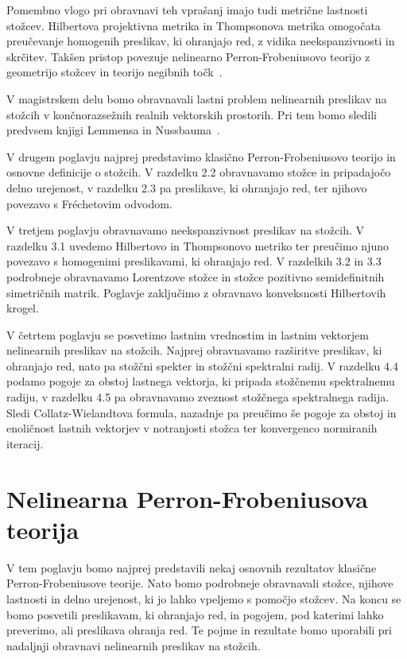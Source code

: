 \documentclass[mat2, tisk]{fmfdelo}
\begin{document}
Pomembno vlogo pri obravnavi teh vprašanj imajo tudi metrične lastnosti
stožcev. Hilbertova projektivna metrika in Thompsonova metrika omogočata
preučevanje homogenih preslikav, ki ohranjajo red, z vidika
neekspanzivnosti in skrčitev. Takšen pristop povezuje nelinearno
Perron-Frobeniusovo teorijo z geometrijo stožcev in teorijo negibnih
točk~\cite{LemNuss}.

V magistrskem delu bomo obravnavali lastni problem nelinearnih
preslikav na stožcih v končnorazsežnih realnih vektorskih prostorih.
Pri tem bomo sledili predvsem knjigi Lemmensa in Nussbauma~\cite{LemNuss}.

V drugem poglavju najprej
predstavimo klasično Perron-Frobeniusovo teorijo in osnovne definicije
o stožcih. V razdelku 2.2 obravnavamo stožce in pripadajočo delno
urejenost, v razdelku 2.3 pa preslikave, ki ohranjajo red, ter njihovo
povezavo s Fréchetovim odvodom.

V tretjem poglavju obravnavamo neekspanzivnost preslikav na stožcih.
V razdelku 3.1 uvedemo Hilbertovo in Thompsonovo metriko ter
preučimo njuno povezavo s homogenimi preslikavami, ki ohranjajo red.
V razdelkih 3.2 in 3.3 podrobneje obravnavamo Lorentzove stožce
in stožce pozitivno semidefinitnih simetričnih matrik. Poglavje
zaključimo z obravnavo konveksnosti Hilbertovih krogel.

V četrtem poglavju se posvetimo lastnim vrednostim in lastnim
vektorjem nelinearnih preslikav na stožcih. Najprej obravnavamo
razširitve preslikav, ki ohranjajo red, nato pa stožčni spekter
in stožčni spektralni radij. V razdelku 4.4 podamo pogoje za obstoj
lastnega vektorja, ki pripada stožčnemu spektralnemu radiju,
v razdelku 4.5 pa obravnavamo zveznost stožčnega spektralnega
radija. Sledi Collatz-Wielandtova formula, nazadnje pa preučimo
še pogoje za obstoj in enoličnost lastnih vektorjev v notranjosti
stožca ter konvergenco normiranih iteracij.

\section{Nelinearna Perron-Frobeniusova teorija}

V tem poglavju bomo najprej predstavili nekaj osnovnih rezultatov klasične Perron-Frobeniusove 
teorije. Nato bomo podrobneje obravnavali stožce, njihove lastnosti in delno urejenost, ki jo 
lahko vpeljemo s pomočjo stožcev. Na koncu se bomo posvetili preslikavam, ki ohranjajo red, 
in pogojem, pod katerimi lahko preverimo, ali preslikava ohranja red. Te pojme in rezultate
bomo uporabili pri nadaljnji obravnavi nelinearnih preslikav na stožcih.
\end{document}
